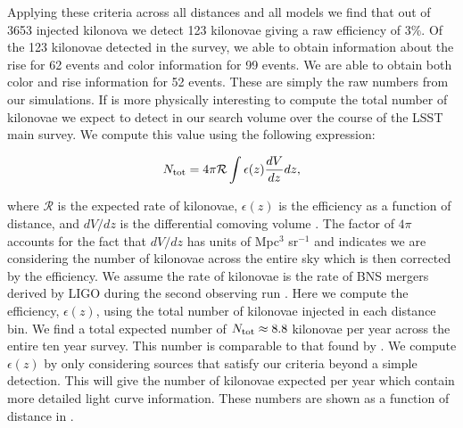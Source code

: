 \clearpage
Applying these criteria across all distances and all models we find that out of 3653 injected kilonova we detect 123 kilonovae giving a raw efficiency of $3\%$. Of the 123 kilonovae detected in the survey, we able to obtain information about the rise for 62 events and color information for 99 events. We are able to obtain both color and rise information for 52 events. These are simply the raw numbers from our simulations. If is more physically interesting to compute the total number of kilonovae we expect to detect in our search volume over the course of the LSST main survey. We compute this value using the following expression:

\begin{equation}
N_{\rm tot} = 4 \pi \mathcal{R} \int \epsilon (z) \frac{dV}{dz} dz,
\end{equation}

\noindent where $\mathcal{R}$ is the expected rate of kilonovae, $\epsilon (z)$ is the efficiency as a function of distance, and $dV/dz$ is the differential comoving volume \citep[see e.g.,][]{Hogg1999}. The factor of $4\pi$ accounts for the fact that $dV/dz$ has units of Mpc$^{3}$ sr$^{-1}$ and indicates we are considering the number of kilonovae across the entire sky which is then corrected by the efficiency. We assume the rate of kilonovae is the rate of BNS mergers derived by LIGO during the second observing run \citep[$\mathcal{R} \apx1500$~Mpc$^{-3}$~yr$^{-1}$,][]{LIGOGW170817}. Here we compute the efficiency, $\epsilon (z)$, using the total number of kilonovae injected in each distance bin. We find a total expected number of $N_{\rm tot} \approx 8.8$ kilonovae per year across the entire ten year survey. This number is comparable to that found by \citet{Scolnic+18}. We compute $\epsilon (z)$ by only considering sources that satisfy our criteria beyond a simple detection. This will give the number of kilonovae expected per year which contain more detailed light curve information. These numbers are shown as a function of distance in .

